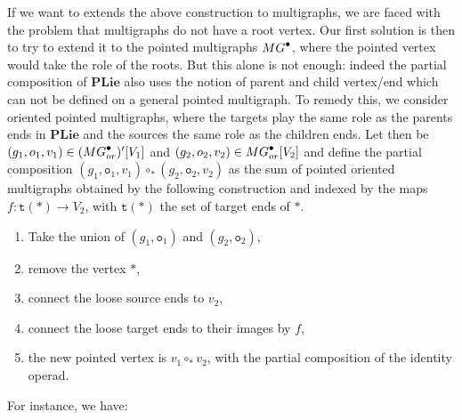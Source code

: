 \documentclass[11pt]{article}
\theoremstyle{definition}
\numberwithin{equation}{section}
\newcommand{\spe}[1]{\normalfont{\textsc{#1}}}
\newcommand{\op}[1]{\mathbf{#1}}
\newcommand{\point}[1]{#1^{\bullet}}
\newcommand{\comp}[1][\ast]{\circ_{#1}}
\newcommand{\ori}{\texttt{o}}
\newcommand{\MG}{\spe{MG}}
\newcommand{\PLie}{\op{PLie}}
\begin{document}
If we want to extends the above construction to multigraphs, we are faced with the problem that multigraphs 
do not have a root vertex. Our first solution is then to try to extend it to the pointed multigraphs 
$\point{\MG}$, where the pointed vertex would take the role of the roots. But this alone is not enough: 
indeed the partial composition of $\PLie$ also uses the notion 
of parent and child vertex/end which can not be defined on a general pointed multigraph. To remedy this, we 
consider oriented pointed multigraphs, where the targets play the same role as the parents ends in $\PLie$ 
and the sources the same role as the children ends.
Let then be $(g_1, \ori_1, v_1) \in (\point{\MG_{or}})'[V_1]$ and $(g_2, \ori_2, v_2) \in\point{\MG_{or}}[V_2]$ and define 
the partial composition $(g_1,\ori_1,v_1)\comp (g_2,\ori_2,v_2)$ as the sum of pointed oriented multigraphs obtained by the 
following construction and indexed by the maps $f:\texttt{t}(\ast)\to V_2$, with $\texttt{t}(\ast)$ the set of target ends of $\ast$.
\begin{enumerate}
    \item Take the union of $(g_1,\ori_1)$ and $(g_2,\ori_2)$,

    \item remove the vertex $\ast$,

    \item connect the loose source ends to $v_2$,

    \item connect the loose target ends to their images by $f$,

    \item the new pointed vertex is $v_1\comp v_2$, with the partial composition of the identity operad.
\end{enumerate}
For instance, we have:
\end{document}
